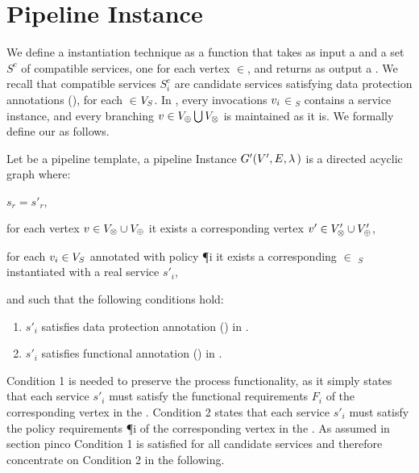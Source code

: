   \section{Pipeline Instance}
  We define a \pipeline instantiation technique as a function that takes as input a \pipelineTemplate \tChartFunction and a set $S^c$ of compatible services, one for each vertex $\in$\V, and returns as output a \pipelineInstance \iChartFunction. We recall that compatible services $S^c_i$ are candidate services satisfying data protection annotations \myLambda(), for each $\in$$V_S$.
    In \iChartFunction, every invocations $v_{i}$$\in$\V$_S$ contains a service instance, and every branching $v\in V_{\oplus}\bigcup V_{\otimes}$ is maintained as it is. We formally define our \pipelineInstance as follows.

  \begin{definition}\label{def:instance}
    Let \tChartFunction be a pipeline template, a pipeline Instance $G'(V',E,\lambda\,)$ is a directed acyclic graph where:
    \begin{enumerate*}[label=\roman*)]
      \item $s_r=s'_r$,
      \item for each vertex $v_{}\in V_{\otimes}\cup V_{\oplus}$ it exists a corresponding vertex $v'_{}\in V'_{\otimes}\cup V'_{\oplus}$,
      \item for each $v_{i}\in V_S$ annotated with policy \P{i} it exists a corresponding $\in$ \Vp$_S$ instantiated with a real service $s'_i$,
    \end{enumerate*}
    and such that the following conditions hold:
    \begin{enumerate}[label=\arabic*)]
      \item $s'_i$ satisfies data protection annotation \myLambda() in \tChartFunction.
      \item $s'_i$ satisfies functional annotation \myGamma() in \tChartFunction.
    \end{enumerate}
  \end{definition}

  Condition 1 is needed to preserve the process functionality, as it simply states that each service $s'_i$ must satisfy the functional requirements $F_i$ of the corresponding vertex  in the \pipelineTemplate.
  Condition 2 states that each service $s'_i$ must satisfy the policy requirements \P{i} of the corresponding vertex  in the \pipelineTemplate.
  As assumed in section pinco Condition 1 is satisfied for all candidate services and therefore concentrate on Condition 2 in the following.

